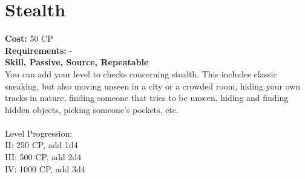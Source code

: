 \section{Stealth}
\textbf{Cost:} 50 CP\\
\textbf{Requirements:} -\\
\textbf{Skill, Passive, Source, Repeatable}\\
You can add your level to checks concerning stealth. This includes classic sneaking, but also moving unseen in a city or a crowded room, hiding your own tracks in nature, finding someone that tries to be unseen, hiding and finding hidden objects, picking someone's pockets, etc.\\
\\
Level Progression:\\
II: 250 CP, add 1d4\\
III: 500 CP, add 2d4\\
IV: 1000 CP, add 3d4\\